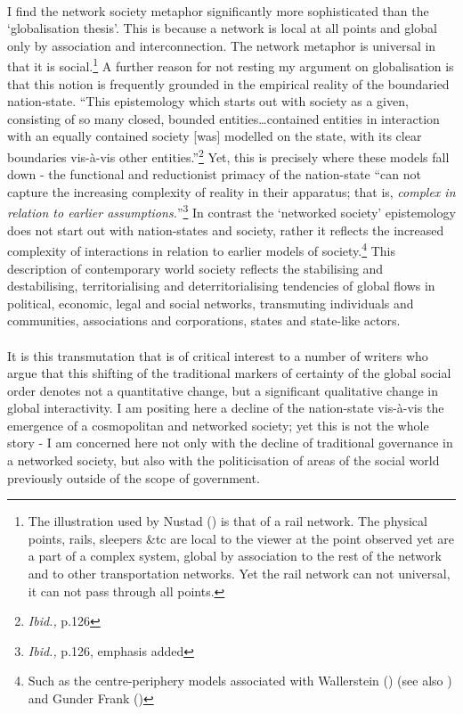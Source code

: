 \documentclass[11pt,titlepage]{book}
\begin{document}
\paragraph{}I find the network society metaphor significantly more sophisticated than the `globalisation thesis'. This is because a network is local at all points and global only by association and interconnection. The network metaphor is universal in that it is social.\footnote{The illustration used by Nustad (\citeyear[p.127]{Nustad:2003}) is that of a rail network. The physical points, rails, sleepers \&tc are local to the viewer at the point observed yet are a part of a complex system, global by association to the rest of the network and to other transportation networks. Yet the rail network can not universal, it can not pass through all points.} A further reason for not resting my argument on globalisation is that this notion is frequently grounded in the empirical reality of the boundaried nation-state. ``This epistemology which starts out with society as a given, consisting of so many closed, bounded entities\ldots contained entities in interaction with an equally contained society [was] modelled on the state, with its clear boundaries vis-\`{a}-vis other entities.''\footnote{\textit{Ibid.,} p.126} Yet, this is precisely where these models fall down - the functional and reductionist primacy of the nation-state ``can not capture the increasing complexity of reality in their apparatus; that is, \emph{complex in relation to earlier assumptions.}''\footnote{\textit{Ibid.,} p.126, emphasis added} In contrast the `networked society' epistemology does not start out with nation-states and society, rather it reflects the increased complexity of interactions in relation to earlier models of society.\footnote{Such as the centre-periphery models associated with Wallerstein (\citeyear{Wallerstein:1979cw}) (see also \cite{worsley:1990ow}) and Gunder Frank (\citeyear{Frank:1975du})} This description of contemporary world society reflects the stabilising and destabilising, territorialising and deterritorialising tendencies of global flows in political, economic, legal and social networks, transmuting individuals and communities, associations and corporations, states and state-like actors.

\paragraph{}It is this transmutation that is of critical interest to a number of writers who argue that this shifting of the traditional markers of certainty of the global social order denotes not a quantitative change, but a significant qualitative change in global interactivity. I am positing here a decline of the nation-state vis-\`{a}-vis the emergence of a cosmopolitan and networked society; yet this is not the whole story - I am concerned here not only with the decline of traditional  governance in a networked society, but also with the politicisation of areas of the social world previously outside of the scope of government.
\end{document}
